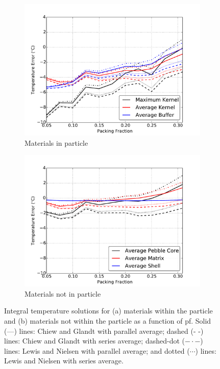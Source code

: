 \begin{figure}[!htb]
\centering
\begin{subfigure}{.49\textwidth}
  \centering
  \includegraphics[width=\linewidth]{figs/hsd_error0.pdf}
  \caption{Materials in particle}
\end{subfigure}
\begin{subfigure}{.49\textwidth}
  \centering
  \includegraphics[width=\linewidth]{figs/hsd_error1.pdf}
  \caption{Materials not in particle}
\end{subfigure}
\caption{Integral temperature solutions for (a) materials within the particle and (b) materials not within the particle as a function of \gls{pf}. Solid (---) lines: Chiew and Glandt with parallel average; dashed (- -) lines: Chiew and Glandt with series average; dashed-dot ($-\cdot -$) lines: Lewis and Nielsen with parallel average; and dotted ($\cdots$) lines: Lewis and Nielsen with series average. }
\label{fig:hsd_err}
\end{figure}

